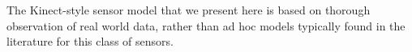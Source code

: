 The Kinect-style sensor model that we present here is based on
thorough observation of real world data, rather than ad hoc models
typically found in the literature for this class of sensors. 





